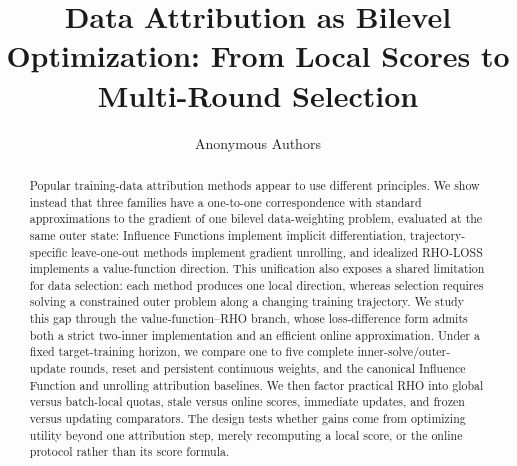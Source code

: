 \documentclass{article}
\title{Data Attribution as Bilevel Optimization: From Local Scores to
Multi-Round Selection}
\author{Anonymous Authors}
\begin{document}
\maketitle

\begin{abstract}
Popular training-data attribution methods appear to use different principles.
We show instead that three families have a one-to-one correspondence with
standard approximations to the gradient of one bilevel data-weighting problem,
evaluated at the same outer state: Influence Functions implement implicit
differentiation, trajectory-specific leave-one-out methods implement gradient
unrolling, and idealized RHO-LOSS implements a value-function direction. This
unification also exposes a shared limitation for data selection: each method
produces one local direction, whereas selection requires solving a constrained
outer problem along a changing training trajectory. We study this gap through
the value-function--RHO branch, whose loss-difference form admits both a strict
two-inner implementation and an efficient online approximation. Under a fixed
target-training horizon, we compare one to five complete inner-solve/outer-
update rounds, reset and persistent continuous weights, and the canonical
Influence Function and unrolling attribution baselines. We then factor
practical RHO into global versus batch-local quotas, stale versus online scores,
immediate updates, and frozen versus updating comparators. The design tests
whether gains come from optimizing utility beyond one attribution step, merely
recomputing a local score, or the online protocol rather than its score formula.
\end{abstract}














\appendix

\end{document}
